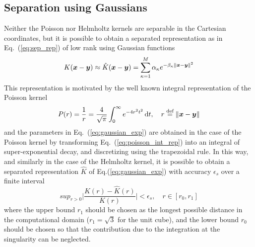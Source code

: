 \subsection{Separation using Gaussians}
Neither the Poisson nor Helmholtz kernels are separable in the Cartesian coordinates, 
but it is possible to obtain a separated representation as in Eq.~(\ref{eq:sep_rep}) 
of low rank using Gaussian functions
\begin{equation}
    \label{eq:gaussian_exp}
    K(\boldsymbol x-\boldsymbol y) \approx \hat{K}(\boldsymbol x-\boldsymbol y) = 
	\sum_{\kappa=1}^M \alpha_\kappa e^{-\beta_\kappa \|\boldsymbol x-\boldsymbol y\|^2}
\end{equation}
This representation is motivated by the well known integral representation of the 
Poisson kernel\cite{something}
\begin{equation}
    \label{eq:poisson_int_rep}
    P(r) = \frac{1}{r} = \frac{4}{\sqrt{\pi}}\int_0^\infty e^{-4r^2t^2}\,\mathrm{d} t, 
	\quad r \stackrel{\text{def}}{\hbox{=}} \|\boldsymbol x-\boldsymbol y\|
\end{equation}
and the parameters in Eq.~(\ref{eq:gaussian_exp}) are obtained in the case of the Poisson 
kernel by transforming Eq.~(\ref{eq:poisson_int_rep}) into an integral of super-exponential 
decay, and discretizing using the trapezoidal rule\cite{Harrison,Frediani}. In this way, 
and similarly in the case of the Helmholtz kernel, it is possible to obtain a separated 
representation $\hat{K}$ of Eq.(\ref{eq:gaussian_exp}) with accuracy $\epsilon_s$ over a 
finite interval
\begin{equation}
    sup_{r>0}\Big|\frac{K(r)-\hat{K}(r)}{K(r)}\Big| < \epsilon_s, \quad r\in[r_0,r_1]
\end{equation}
where the upper bound $r_1$ should be chosen as the longest possible distance
in the computational domain ($r_1=\sqrt{3}$ for the unit cube), and the lower
bound $r_0$ should be chosen so that the contribution due to the integration
at the singularity can be neglected\cite{Frediani}.

